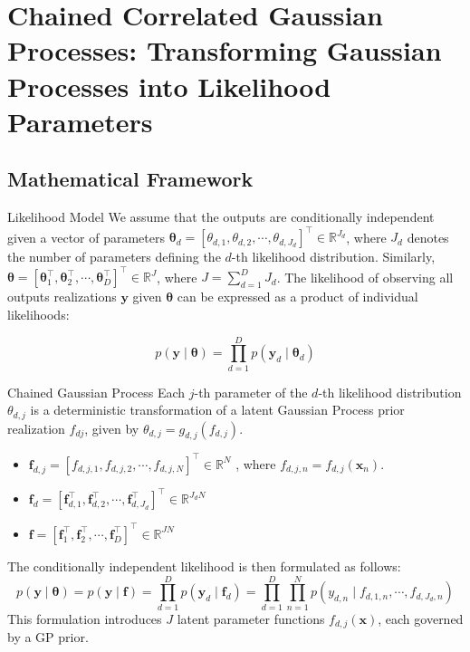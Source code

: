 \section[Chained Correlated Gaussian Processes]{Chained Correlated Gaussian Processes: Transforming Gaussian Processes into Likelihood Parameters}

\subsection{Mathematical Framework}

\begin{frame}{Likelihood Model}
	We assume that the outputs are conditionally independent given a vector of parameters $\boldsymbol{\theta}_d = [\theta_{d,1}, \theta_{d,2}, \cdots, \theta_{d,J_d}]^\top \in \mathbb{R}^{J_d}$, where $J_d$ denotes the number of parameters defining the $d$-th likelihood distribution. Similarly, $\boldsymbol{\theta} = [\boldsymbol{\theta}_1^\top, \boldsymbol{\theta}_2^\top, \cdots, \boldsymbol{\theta}_D^\top]^\top \in \mathbb{R}^{J}$, where $J = \sum_{d=1}^D J_d$. The likelihood of observing all outputs realizations $\mathbf{y}$ given $\boldsymbol{\theta}$ can be expressed as a product of individual likelihoods:
	
	\begin{equation*}
		p(\mathbf{y} \mid \boldsymbol{\theta}) = \prod_{d=1}^D p\left(\mathbf{y}_d\mid \boldsymbol{\theta}_{d}\right)
	\end{equation*}
	
\end{frame}

\begin{frame}{Chained Gaussian Process}
	Each $j$-th parameter of the $d$-th likelihood distribution $\theta_{d,j}$ is a deterministic transformation of a latent Gaussian Process prior realization $f_{dj}$, given by $\theta_{d,j} = g_{d,j}(f_{d,j})$.
	\begin{itemize}
		\item $\mathbf{f}_{d,j} = [f_{d,j,1}, f_{d,j,2}, \cdots, f_{d,j,N}]^\top \in \mathbb{R}^{N}$ , where $f_{d,j,n} = f_{d,j}(\mathbf{x}_n)$.
		\item $\mathbf{f}_{d} = [\mathbf{f}_{d,1}^\top, \mathbf{f}_{d,2}^\top, \cdots, \mathbf{f}_{d,J_d}^\top]^\top \in \mathbb{R}^{J_dN}$ 
		\item $\mathbf{f} = [\mathbf{f}_1^\top, \mathbf{f}_2^\top, \cdots, \mathbf{f}_D^\top]^\top \in \mathbb{R}^{JN}$ 
	\end{itemize}
	
	The conditionally independent likelihood is then formulated as follows: \begin{equation}
		p(\mathbf{y} \mid \boldsymbol{\theta}) = p(\mathbf{y} \mid \mathbf{f}) = \prod_{d=1}^D p(\mathbf{y}_d\mid \mathbf{f}_{d}) = \prod_{d=1}^D \prod_{n=1}^N p(y_{d,n}\mid f_{d,1,n}, \cdots, f_{d, J_d, n})
	\end{equation}
	This formulation introduces $J$ latent parameter functions $f_{d,j}(\mathbf{x})$, each governed by a GP prior.
	
\end{frame}


